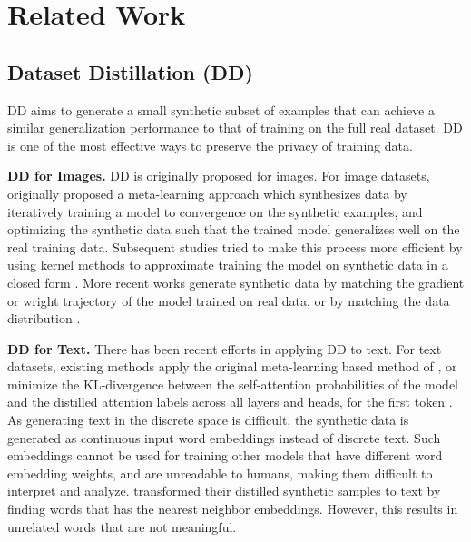 \section{Related Work}

\subsection{Dataset Distillation (DD)}
DD aims to generate a small synthetic subset of examples that can achieve a similar generalization performance to that of training on the full real dataset. DD is one of the most effective ways to preserve the privacy of training data.
%

\textbf{DD for Images.} DD is originally proposed for images. For image datasets, \citet{wang2018dataset} originally proposed a meta-learning approach which synthesizes data by iteratively training a model to convergence on the synthetic examples, and optimizing the synthetic data such that the trained model generalizes well on the real training data. 
Subsequent studies tried to make this process more efficient by using kernel methods %
to approximate training the model on synthetic data in a closed form \cite{loo2022efficient,nguyen2020dataset}. 
More recent works generate synthetic data by matching the gradient \cite{zhao2020dataset,zhao2021dataset,kim2022dataset} or wright trajectory \cite{cazenavette2022dataset,wang2022cafe} of the model trained on real data, or by matching the data distribution \cite{zhao2023dataset}.

\textbf{DD for Text. } 
There has been recent efforts in applying DD to text.
For text datasets, existing methods \cite{sucholutsky2021soft, li2021data,sahni2023exploring} apply the original meta-learning based method of \cite{wang2018dataset}, or minimize the KL-divergence between the self-attention probabilities of the model and the distilled attention labels across all layers and heads, for the first token \citet{maekawa2023dataset}. 
%
%
As generating text in the discrete space is difficult, the synthetic data is generated as continuous input word embeddings instead of discrete text.  
%
%
%
%
Such embeddings cannot be used for training other models that have different word embedding weights, and
%
%
%
are unreadable to humans, making them difficult to interpret and analyze. %
\citet{sucholutsky2021soft,sahni2023exploring} transformed their distilled synthetic samples to text by finding words that has the nearest neighbor embeddings. However, this results in unrelated words that are not meaningful.
%




